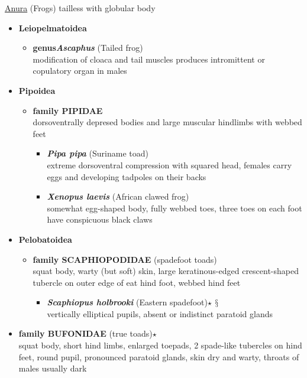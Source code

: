 \documentclass[a4paper,12pt]{article}
\begin{document}
\begin{description}
\item{\underline{{\LARGE{Anura}}}}
(Frogs) tailless with globular body
\begin{itemize}
  \item{\textbf{Leiopelmatoidea}}
  \begin{itemize}
    \item{\textbf{genus\textit{Ascaphus}} (Tailed frog)} \\ modification of cloaca and tail muscles produces intromittent or copulatory organ in males
  \end{itemize}
  \item{\textbf{Pipoidea}}
  \begin{itemize}
    \item{\textbf{family PIPIDAE}} \\ dorsoventrally depresed bodies and large muscular hindlimbs with webbed feet
    \begin{itemize}
      \item{\textbf{\textit{Pipa pipa}} (Suriname toad)} \\ extreme dorsoventral compression with squared head, females carry eggs and developing tadpoles on their backs
      \item{\textbf{\textit{Xenopus laevis}} (African clawed frog)} \\ somewhat egg-shaped body, fully webbed toes, three toes on each foot have conspicuous black claws
    \end{itemize}
  \end{itemize}
  \item{\textbf{Pelobatoidea}}
  \begin{itemize}
    \item{\textbf{family SCAPHIOPODIDAE} (spadefoot toads)} \\ squat body, warty (but soft) skin, large keratinous-edged crescent-shaped tubercle on outer edge of eat hind foot, webbed hind feet
    \begin{itemize}
      \item{\textbf{\textit{Scaphiopus holbrooki}} (Eastern spadefoot)$\star$ $\mathsection$} \\ vertically elliptical pupils, absent or indistinct paratoid glands
    \end{itemize}
  \end{itemize}
  \item{\textbf{family BUFONIDAE} (true toads)$\star$} \\ squat body, short hind limbs, enlarged toepads, 2 spade-like tubercles on hind feet, round pupil, pronounced paratoid glands, skin dry and warty, throats of males usually dark

\end{itemize}
\end{description}
\end{document}
